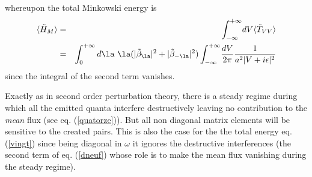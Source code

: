 whereupon the total Minkowski energy is
\begin{eqnarray}
\bk{\tilde H_M} &=&  \int_{-\infty}^{+\infty} \! dV
\bk{\tilde T_{VV}}
\nonumber\\ &=&  \int_{0}^{+\infty}  d\la\ \la (|
 \tilde \beta_{\la}|^2 +| \tilde \beta_{- \la}|^2)
  \int_{-\infty}^{+\infty} \! {dV \over 2 \pi} {1 \over a^2 |V+i
\epsilon|^2 }
\label{vingt}
\end{eqnarray}
since the integral of the second term vanishes.

Exactly as in second order perturbation theory,
there is a steady regime during which all the emitted quanta interfere
destructively
leaving no contribution to the
{\it
mean
}
flux (see eq. (\ref{quatorze})). But all non diagonal matrix
elements will be sensitive to the
created pairs. This is also the case for the
the total energy eq. (\ref{vingt}) since being diagonal in
$ \omega$
it ignores the destructive interferences (the second term of eq.
(\ref{dneuf}) whose role is to make the mean flux vanishing during the steady
regime).

